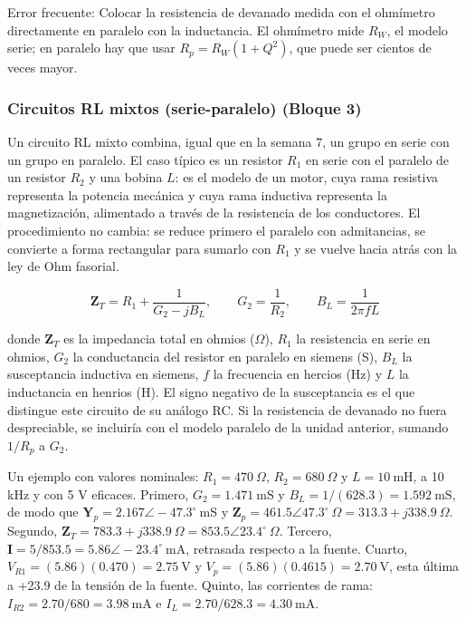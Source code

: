 \documentclass[11pt,letterpaper]{article}
\begin{document}
\begin{nota}{Error frecuente:}
Colocar la resistencia de devanado medida con el ohmímetro directamente en paralelo con la inductancia. El ohmímetro mide $R_W$, el modelo serie; en paralelo hay que usar $R_p = R_W(1 + Q^2)$, que puede ser cientos de veces mayor.
\end{nota}

\subsubsection{Circuitos RL mixtos (serie-paralelo) (Bloque 3)}

Un circuito RL mixto combina, igual que en la semana 7, un grupo en serie con un grupo en paralelo. El caso típico es un resistor $R_1$ en serie con el paralelo de un resistor $R_2$ y una bobina $L$: es el modelo de un motor, cuya rama resistiva representa la potencia mecánica y cuya rama inductiva representa la magnetización, alimentado a través de la resistencia de los conductores. El procedimiento no cambia: se reduce primero el paralelo con admitancias, se convierte a forma rectangular para sumarlo con $R_1$ y se vuelve hacia atrás con la ley de Ohm fasorial.

\begin{equation}
  \mathbf{Z}_T = R_1 + \frac{1}{G_2 - jB_L}, \qquad G_2 = \frac{1}{R_2}, \qquad B_L = \frac{1}{2\pi f L}
\end{equation}

donde $\mathbf{Z}_T$ es la impedancia total en ohmios (\ensuremath{\Omega}), $R_1$ la resistencia en serie en ohmios, $G_2$ la conductancia del resistor en paralelo en siemens (S), $B_L$ la susceptancia inductiva en siemens, $f$ la frecuencia en hercios (Hz) y $L$ la inductancia en henrios (H). El signo negativo de la susceptancia es el que distingue este circuito de su análogo RC. Si la resistencia de devanado no fuera despreciable, se incluiría con el modelo paralelo de la unidad anterior, sumando $1/R_p$ a $G_2$.

Un ejemplo con valores nominales: $R_1 = 470\ \Omega$, $R_2 = 680\ \Omega$ y $L = 10\ \text{mH}$, a 10 kHz y con 5 V eficaces. Primero, $G_2 = 1.471\ \text{mS}$ y $B_L = 1/(628.3) = 1.592\ \text{mS}$, de modo que $\mathbf{Y}_p = 2.167 \angle -47.3^\circ\ \text{mS}$ y $\mathbf{Z}_p = 461.5 \angle 47.3^\circ\ \Omega = 313.3 + j338.9\ \Omega$. Segundo, $\mathbf{Z}_T = 783.3 + j338.9\ \Omega = 853.5 \angle 23.4^\circ\ \Omega$. Tercero, $\mathbf{I} = 5/853.5 = 5.86 \angle -23.4^\circ\ \text{mA}$, retrasada respecto a la fuente. Cuarto, $V_{R1} = (5.86)(0.470) = 2.75\ \text{V}$ y $V_p = (5.86)(0.4615) = 2.70\ \text{V}$, esta última a +23.9\textdegree{} de la tensión de la fuente. Quinto, las corrientes de rama: $I_{R2} = 2.70/680 = 3.98\ \text{mA}$ e $I_L = 2.70/628.3 = 4.30\ \text{mA}$.
\end{document}
